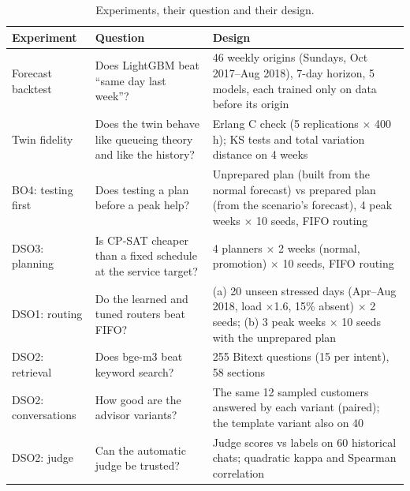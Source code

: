 \begin{table}[h]
\centering\small
\caption{Experiments, their question and their design.}
\label{tab:experiments}
\begin{tabularx}{\textwidth}{@{}p{2.6cm}Yp{6.4cm}@{}}
\toprule
\textbf{Experiment} & \textbf{Question} & \textbf{Design} \\
\midrule
Forecast backtest & Does LightGBM beat ``same day last week''? &
  46 weekly origins (Sundays, Oct 2017--Aug 2018), 7-day horizon, 5 models, each trained only on data before
  its origin \\
Twin fidelity & Does the twin behave like queueing theory and like the history? &
  Erlang C check (5 replications $\times$ 400 h); KS tests and total variation distance on 4 weeks \\
BO4: testing first & Does testing a plan before a peak help? &
  Unprepared plan (built from the normal forecast) vs prepared plan (from the scenario's forecast), 4 peak
  weeks $\times$ 10 seeds, FIFO routing \\
DSO3: planning & Is CP-SAT cheaper than a fixed schedule at the service target? &
  4 planners $\times$ 2 weeks (normal, promotion) $\times$ 10 seeds, FIFO routing \\
DSO1: routing & Do the learned and tuned routers beat FIFO? &
  (a) 20 unseen stressed days (Apr--Aug 2018, load $\times$1.6, 15\% absent) $\times$ 2 seeds;
  (b) 3 peak weeks $\times$ 10 seeds with the unprepared plan \\
DSO2: retrieval & Does bge-m3 beat keyword search? & 255 Bitext questions (15 per intent), 58 sections \\
DSO2: conversations & How good are the advisor variants? &
  The same 12 sampled customers answered by each variant (paired); the template variant also on 40 \\
DSO2: judge & Can the automatic judge be trusted? &
  Judge scores vs labels on 60 historical chats; quadratic kappa and Spearman correlation \\
\bottomrule
\end{tabularx}
\end{table}

